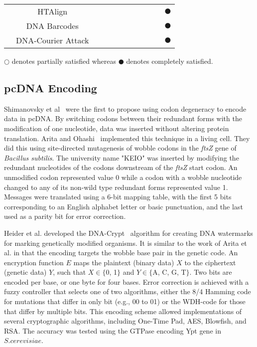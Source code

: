 \documentclass{bioinfo}
\begin{document}
\begin{table*}[t]
{\begin{tabular}{|c|c|c|c|c|c|c|c|c|c|c|}
		&HTAlign~\cite{HB2011IEEEICOBAB}  &  &  &\centering{$\CIRCLE$}  &  &\centering{$\Circle$}  &\centering{$\Circle$}  &  &  &$\CIRCLE$\\ \cline{2-11}
		&DNA Barcodes~\cite{KS2015BMCB}  &\centering{$\CIRCLE$}  &  &\centering{$\CIRCLE$}  &  &\centering{$\CIRCLE$}  &\centering{$\CIRCLE$}  &  &  &$\CIRCLE$\\ \cline{2-11}
		&DNA-Courier Attack~\cite{CLY2015SAPW}  &  &  &\centering{$\CIRCLE$}  &\centering{$\CIRCLE$}  &  &  &  &\centering{$\CIRCLE$}  &$\CIRCLE$\\ \hline
	\end{tabular}}
    \fontsize{7pt}{12pt}\selectfont
    \raggedright $\Circle$ denotes partially satisfied whereas $\CIRCLE$ denotes completely satisfied.
\end{table*}

\subsection{pcDNA Encoding}

Shimanovsky et al~\cite{SFHC2003BL} were the first to propose using codon degeneracy to encode data in pcDNA. By switching codons between their redundant forms with the modification of one nucleotide, data was inserted without altering protein translation. Arita and Ohashi~\cite{AY2004BP} implemented this technique in a living cell. They did this using site-directed mutagenesis of wobble codons in the \textit{ftsZ} gene of \textit{Bacillus subtilis}. The university name "KEIO" was inserted by modifying the redundant nucleotides of the codons downstream of the \textit{ftsZ} start codon. An unmodified codon represented value 0 while a codon with a wobble nucleotide changed to any of its non-wild type redundant forms represented value 1. Messages were translated using a 6-bit mapping table, with the first 5 bits corresponding to an English alphabet letter or basic punctuation, and the last used as a parity bit for error correction.

Heider et al. developed the DNA-Crypt~\cite{HBBMC2007} algorithm for creating DNA watermarks for marking genetically modified organisms. It is similar to the work of Arita et al. in that the encoding targets the wobble base pair in the genetic code. An encryption function $E$ maps the plaintext (binary data) $X$ to the ciphertext (genetic data) $Y$, such that $X \in  \{$0, 1$\}$ and $Y \in \{$A, C, G, T$\}$. Two bits are encoded per base, or one byte for four bases. Error correction is achieved with a fuzzy controller that selects one of two algorithms, either the 8/4 Hamming code for mutations that differ in only bit (e.g., 00 to 01) or the WDH-code for those that differ by multiple bits. This encoding scheme allowed implementations of several cryptographic algorithms, including One-Time Pad, AES, Blowfish, and RSA. The accuracy was tested using the GTPase encoding Ypt gene in $S. cerevisiae$.
\end{document}

